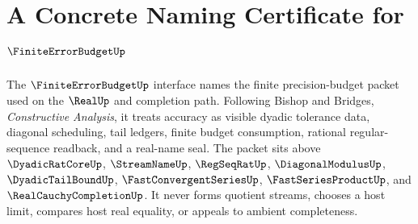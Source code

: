 \chapter{A Concrete Naming Certificate for $\FiniteErrorBudgetUp$}
\label{ch:concrete-instances-finiteerrorbudget-namecert}

The $\FiniteErrorBudgetUp$ interface names the finite precision-budget packet
used on the $\RealUp$ and completion path. Following Bishop and Bridges,
\emph{Constructive Analysis}, it treats accuracy as visible dyadic tolerance
data, diagonal scheduling, tail ledgers, finite budget consumption, rational
regular-sequence readback, and a real-name seal. The packet sits above
$\DyadicRatCoreUp$, $\StreamNameUp$, $\RegSeqRatUp$, $\DiagonalModulusUp$,
$\DyadicTailBoundUp$, $\FastConvergentSeriesUp$, $\FastSeriesProductUp$, and
$\RealCauchyCompletionUp$. It never forms quotient streams, chooses a host
limit, compares host real equality, or appeals to ambient completeness.

